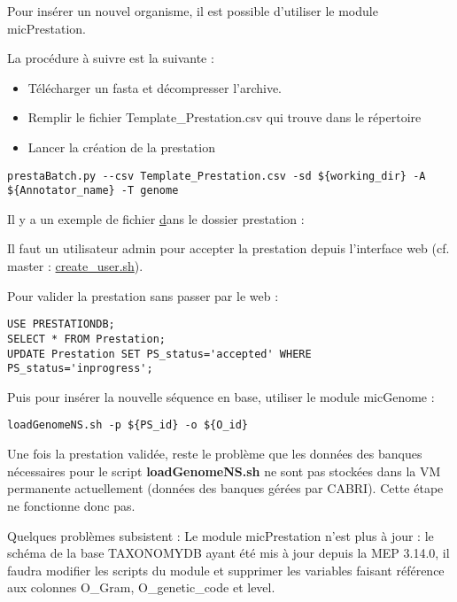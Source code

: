 Pour insérer un nouvel organisme, il est possible d’utiliser le module micPrestation.

La procédure à suivre est la suivante :
\begin{itemize}
    \item Télécharger un fasta et décompresser l'archive.
    \item Remplir le fichier Template\_Prestation.csv qui trouve dans le répertoire 
    \item Lancer la création de la prestation
\end{itemize}

\begin{lstlisting}[style=bash]
prestaBatch.py --csv Template_Prestation.csv -sd ${working_dir} -A ${Annotator_name} -T genome
\end{lstlisting}
Il y a un exemple de fichier \href{Template\_Prestation.csv} dans le dossier prestation : 
\newline
\begin{mycolorbox}
	Il faut un utilisateur admin pour accepter la prestation depuis l'interface web (cf. master : \href{https://github.com/IFB-ElixirFr/biosphere-microcloud/blob/master/master/create_user.sh}{create\_user.sh}).
\end{mycolorbox}
\bigskip

Pour valider la prestation sans passer par le web :
\begin{lstlisting}[style=SQL]
USE PRESTATIONDB;
SELECT * FROM Prestation;
UPDATE Prestation SET PS_status='accepted' WHERE PS_status='inprogress';
\end{lstlisting}
\bigskip
Puis pour insérer la nouvelle séquence en base, utiliser le module micGenome :
\begin{lstlisting}[style=bash]
loadGenomeNS.sh -p ${PS_id} -o ${O_id}
\end{lstlisting}

\begin{mycolorbox}
	Une fois la prestation validée, reste le problème que les données des banques nécessaires pour le script \textbf{loadGenomeNS.sh} ne sont pas stockées dans la VM permanente actuellement (données des banques gérées par CABRI).
	Cette étape ne fonctionne donc pas.
\end{mycolorbox}

Quelques problèmes subsistent :
Le module micPrestation n'est plus à jour : le schéma de la base TAXONOMYDB ayant été mis à jour depuis la MEP 3.14.0, il faudra modifier les scripts du module et supprimer les variables faisant référence aux colonnes O\_Gram, O\_genetic\_code et level.
\newline

